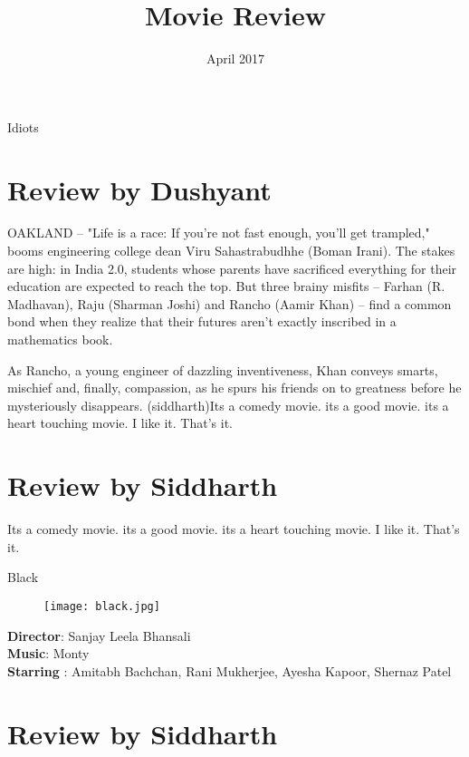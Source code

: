 \documentclass{article}
\title{Movie Review}
\date{April 2017}
\begin{document}
 Idiots
\section{Review by Dushyant}
OAKLAND -- "Life is a race: If you're not fast enough, you'll get trampled," booms engineering college dean Viru Sahastrabudhhe (Boman Irani). The stakes are high: in India 2.0, students whose parents have sacrificed everything for their education are expected to reach the top. But three brainy misfits -- Farhan (R. Madhavan), Raju (Sharman Joshi) and Rancho (Aamir Khan) -- find a common bond when they realize that their futures aren't exactly inscribed in a mathematics book.

As Rancho, a young engineer of dazzling inventiveness, Khan conveys smarts, mischief and, finally, compassion, as he spurs his friends on to greatness before he mysteriously disappears.
(siddharth)Its a comedy movie. its a good movie. its a heart touching movie. I like it. That's it. 



\section{Review by Siddharth}Its a comedy movie. its a good movie. its a heart touching movie. I like it. That's it.

  


\maketitle

Black
\begin{figure}[h!]
  \texttt{[image: black.jpg]}
\end{figure}
\begin{flushleft}
\textsf{\textbf{Director}: Sanjay Leela Bhansali\\ 
        \textbf{Music}: Monty\\
        \textbf{Starring} : Amitabh Bachchan, Rani Mukherjee, Ayesha Kapoor, Shernaz Patel}\\
\end{flushleft}  
                           
         \vspace{2mm}

\section{Review by Siddharth}
\end{document}
